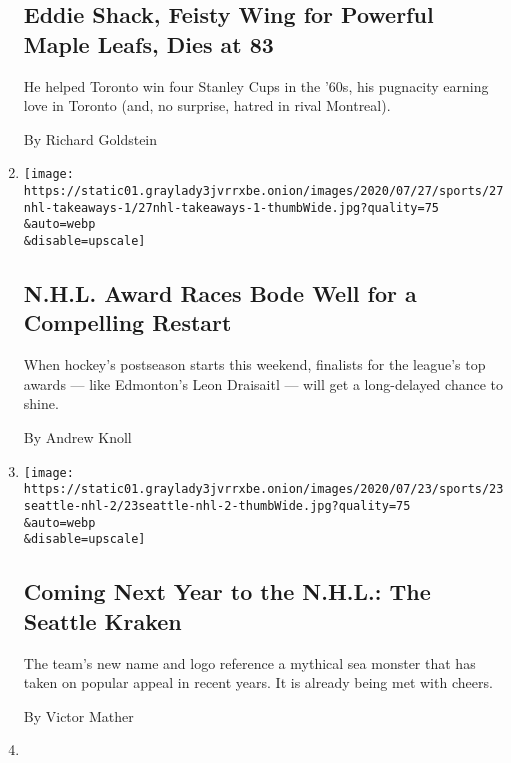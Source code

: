 \begin{enumerate}
  \hypertarget{eddie-shack-feisty-wing-for-powerful-maple-leafs-dies-at-83}{%
  \subsection{Eddie Shack, Feisty Wing for Powerful Maple Leafs, Dies at
  83}\label{eddie-shack-feisty-wing-for-powerful-maple-leafs-dies-at-83}}

  He helped Toronto win four Stanley Cups in the '60s, his pugnacity
  earning love in Toronto (and, no surprise, hatred in rival Montreal).

  By Richard Goldstein
\item
  \href{/2020/07/27/sports/hockey/nhl-awards-restart-postseason.html}{}

  \texttt{[image: https://static01.graylady3jvrrxbe.onion/images/2020/07/27/sports/27nhl-takeaways-1/27nhl-takeaways-1-thumbWide.jpg?quality=75\\\&auto=webp\\\&disable=upscale]}

  \hypertarget{nhl-award-races-bode-well-for-a-compelling-restart}{%
  \subsection{N.H.L. Award Races Bode Well for a Compelling
  Restart}\label{nhl-award-races-bode-well-for-a-compelling-restart}}

  When hockey's postseason starts this weekend, finalists for the
  league's top awards --- like Edmonton's Leon Draisaitl --- will get a
  long-delayed chance to shine.

  By Andrew Knoll
\item
  \href{/2020/07/23/sports/hockey/seattle-kraken-nhl-team-name.html}{}

  \texttt{[image: https://static01.graylady3jvrrxbe.onion/images/2020/07/23/sports/23seattle-nhl-2/23seattle-nhl-2-thumbWide.jpg?quality=75\\\&auto=webp\\\&disable=upscale]}

  \hypertarget{coming-next-year-to-the-nhl-the-seattle-kraken}{%
  \subsection{Coming Next Year to the N.H.L.: The Seattle
  Kraken}\label{coming-next-year-to-the-nhl-the-seattle-kraken}}

  The team's new name and logo reference a mythical sea monster that has
  taken on popular appeal in recent years. It is already being met with
  cheers.

  By Victor Mather
\item
  \href{/2020/07/22/sports/hockey/nhl-pay-cut-employees-restart.html}{}


\end{enumerate}
